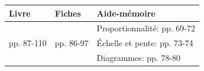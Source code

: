 

\def\arraystretch{1.2}
\begin{tabularx}{\linewidth}{|>{\centering\arraybackslash}p{3cm}|>{\centering\arraybackslash}p{3cm}|X|}
\hline
\cellcolor{themeColor!30} Livre & \cellcolor{themeColor!30} Fiches & \cellcolor{themeColor!30} \hfill Aide-mémoire\hfill\null\\
\hline
&&Proportionnalité: pp. 69-72\\
pp. 87-110&pp. 86-97&Échelle et pente: pp. 73-74\\
&&Diagrammes: pp. 78-80\\
\hline
\end{tabularx}
\def\arraystretch{1}

